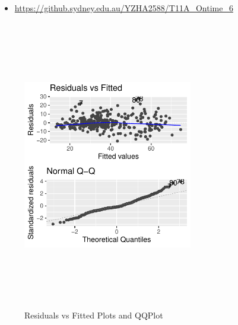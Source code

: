 \documentclass[letterpaper,9pt,twocolumn,twoside,]{pinp}
\providecommand{\tightlist}{%
  \setlength{\itemsep}{0pt}\setlength{\parskip}{0pt}}
\begin{document}
\begin{itemize}
\tightlist
\item
  \url{https://github.sydney.edu.au/YZHA2588/T11A_Ontime_6}
\end{itemize}

\begin{figure}
  \begin{center}
    \includegraphics[width=0.66\textwidth, height=5in]{resid} 
  \end{center}
  \caption{Residuals vs Fitted Plots and QQPlot}\label{fig}
\end{figure}





\end{document}
